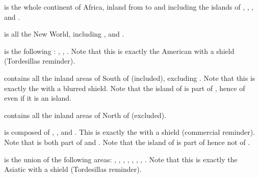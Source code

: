 \begin{deflist}
\item[\anchorcontinent{Africa}] is the whole continent of Africa, inland from
  \granderegionMauritanie to \granderegionSoudan and including the islands of
  , ,
  ,  and
  .
\item[\anchorcontinent{America}] is all the New World, including
  ,  and .
\item[\anchorcontinent{Brazil}] is the following \Areas: ,
  , . Note that this is exactly the
  American \Areas with a  shield (Tordesillas reminder).
\item[\anchorcontinent{Spanish World}] contains all the inland areas of
   South of  (included), excluding
  . Note that this is exactly the \Areas with a blurred
   shield. Note that the island of \provinceTrinidad is
  part of \granderegionGuyana, hence of  even if it
  is an island.
\item[\anchorcontinent{North America}] contains all the inland areas of
   North of  (excluded).
\item[\anchorcontinent{Caraibes}] is composed of ,
  ,  and
  . This is exactly the \Areas with a
   shield (commercial reminder). Note that
  \granderegionFlorida is both part of  and
  \continentCaraibes. Note that the island of \provinceTrinidad is part of
  \granderegionGuyana hence not of .
\item[\anchorcontinent{Extreme Orient}] is the union of the following areas:
  , , \granderegionCoree,
  , , ,
  , \granderegionPhilippines. Note that this is exactly
  the Asiatic \Areas with a  shield (Tordesillas
  reminder).

\end{deflist}
